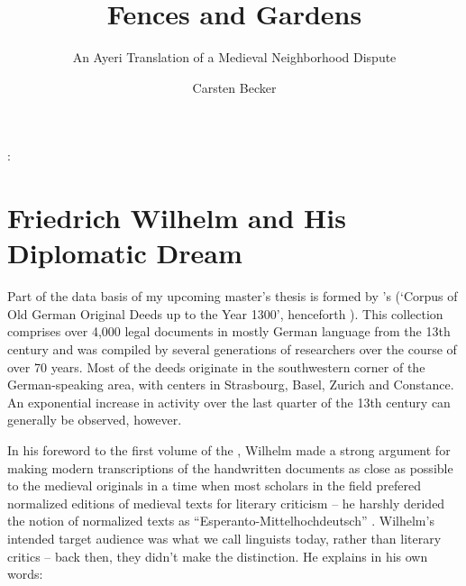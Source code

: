 \documentclass[12pt,paper=a4]{scrartcl}
\author{Carsten Becker}
\title{Fences and Gardens}
\subtitle{An Ayeri Translation of a Medieval Neighborhood Dispute}
\newenvironment{mytitle}{
    \hfill
    \begin{minipage}{0.667\textwidth}
	\vspace{\baselineskip}
	\begin{center}
	    \Large
	    \sffamily\bfseries
	    \makeatletter
}{
	    \makeatother
	\end{center}
	\vspace{1em}
    \end{minipage}
    \hfill
}
\begin{document}

\begin{mytitle}
    \@title: \@subtitle
\end{mytitle}

\section{Friedrich Wilhelm and His Diplomatic Dream}
Part of the data basis of my upcoming master's thesis is formed by 
\citeauthor{CAO}'s  (\enquote*{Corpus of Old German Original 
Deeds up to the Year 1300}, henceforth ). This collection 
comprises over 4,000 legal documents in mostly German language from the 13th 
century and was compiled by several generations of researchers over the course 
of over 70 years. Most of the deeds originate in the southwestern corner of the 
German-speaking area, with centers in Strasbourg, Basel, Zurich and Constance. 
An exponential increase in activity over the last quarter of the 13th century 
can generally be observed, however.

In his foreword to the first volume of the , Wilhelm made a 
strong argument for making modern transcriptions of the handwritten documents as 
close as possible to the medieval originals in a time when most scholars in the 
field prefered normalized editions of medieval texts for literary criticism – he 
harshly derided the notion of normalized texts as 
\enquote{Esperanto-Mittelhochdeutsch} \autocite[VIII--IX]{CAO1}. Wilhelm's 
intended target audience was what we call linguists today, rather than literary 
critics -- back then, they didn't make the distinction. He explains in his own 
words:
\end{document}
